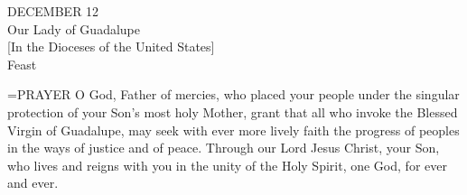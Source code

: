 \begin{center}\normalsize DECEMBER 12\\
\footnotesize Our Lady of Guadalupe\\
\footnotesize [In the Dioceses of the United States]\\
\footnotesize Feast\\
\end{center}

\hangindent=\parindent \small{PRAYER 
O God, Father of mercies,
who placed your people under the singular protection
of your Son's most holy Mother,
grant that all who invoke the Blessed Virgin of Guadalupe,
may seek with ever more lively faith the progress of peoples in the ways of justice and of peace.
Through our Lord Jesus Christ, your Son,
who lives and reigns with you in the unity of the Holy Spirit,
one God, for ever and ever.\\}
 
